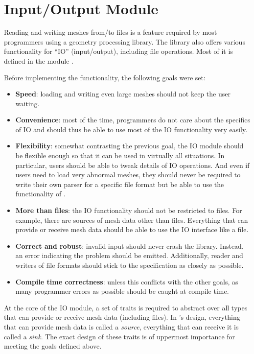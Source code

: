 \section{Input/Output Module}
\label{chap:io}

Reading and writing meshes from/to files is a feature required by most programmers using a geometry processing library.
The library  also offers various functionality for \enquote{IO} (input/output), including file operations.
Most of it is defined in the module .

Before implementing the functionality, the following goals were set:

\begin{itemize}
  \item \textbf{Speed}: loading and writing even large meshes should not keep the user waiting.
  \item \textbf{Convenience}: most of the time, programmers do not care about the specifics of IO and should thus be able to use most of the IO functionality very easily.
  \item \textbf{Flexibility}: somewhat contrasting the previous goal, the IO module should be flexible enough so that it can be used in virtually all situations.
  In particular, users should be able to tweak details of IO operations.
  And even if users need to load very abnormal meshes, they should never be required to write their own parser for a specific file format but be able to use the functionality of .
  \item \textbf{More than files}: the IO functionality should not be restricted to files.
  For example, there are sources of mesh data other than files.
  Everything that can provide or receive mesh data should be able to use the IO interface like a file.
  \item \textbf{Correct and robust}: invalid input should never crash the library.
  Instead, an error indicating the problem should be emitted.
  Additionally, reader and writers of file formats should stick to the specification as closely as possible.
  \item \textbf{Compile time correctness}: unless this conflicts with the other goals, as many programmer errors as possible should be caught at compile time.
\end{itemize}

\vfill
At the core of the IO module, a set of traits is required to abstract over all types that can provide or receive mesh data (including files).
In 's design, everything that can provide mesh data is called a \emph{source}, everything that can receive it is called a \emph{sink}.
The exact design of these traits is of uppermost importance for meeting the goals defined above.

